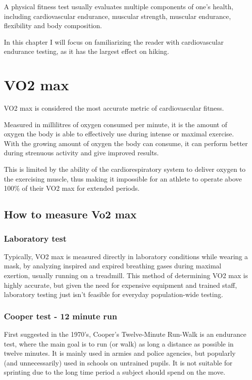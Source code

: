 A physical fitness test usually evaluates multiple components of one's health, including cardiovascular endurance, muscular strength, muscular endurance, flexibility and body composition.

In this chapter I will focus on familiarizing the reader with cardiovascular endurance testing, as it has the largest effect on hiking.

\section{VO2 max}

VO2 max is considered the most accurate metric of cardiovascular fitness.

Measured in millilitres of oxygen consumed per minute, it is the amount of oxygen the body is able to effectively use during intense or maximal exercise.
With the growing amount of oxygen the body can consume, it can perform better during strenuous activity and give improved results.\cite{vo2max-definition}

This is limited by the ability of the cardiorespiratory system to deliver oxygen to the exercising muscle, thus making it impossible for an athlete to operate above 100\% of their VO2 max for extended periods.\cite{vo2max-oxygen-delivery}

\subsection{How to measure Vo2 max}

\subsubsection*{Laboratory test}

Typically, VO2 max is measured directly in laboratory conditions while wearing a mask, by analyzing inspired and expired breathing gases during maximal exertion,\cite{vo2max-definition} usually running on a treadmill.
This method of determining VO2 max is highly accurate, but given the need for expensive equipment and trained staff, laboratory testing just isn't feasible for everyday population-wide testing.

\subsubsection*{Cooper test - 12 minute run}

First suggested in the 1970's, Cooper's Twelve-Minute Run-Walk is an endurance test, where the main goal is to run (or walk) as long a distance as possible in twelve minutes.
It is mainly used in armies and police agencies, but popularly (and unnecessarily\cite{cooper-pupils}) used in schools on untrained pupils.
It is not suitable for sprinting due to the long time period a subject should spend on the move.

